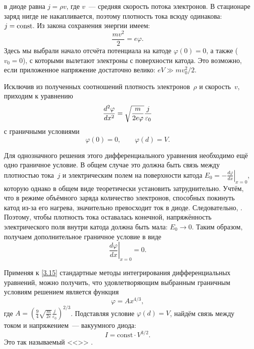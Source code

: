  в диоде равна $j=\rho v$, где $v$~---
средняя скорость потока электронов. В стационаре заряд нигде не накапливается,
поэтому плотность тока всюду одинакова: $j=\mathrm{const}$. Из закона сохранения
энергии имеем:
\begin{equation*}
    \frac{mv^2}{2}=e\varphi.
\end{equation*}
Здесь мы выбрали начало отсчёта потенциала на катоде $\varphi(0)=0$, а также
 ($v_0=0$),
с которыми вылетают электроны с поверхности катода. Это возможно, если
приложенное напряжение достаточно велико: $eV\gg mv_0^2/2$.

Исключив из полученных соотношений плотность электронов~$\rho$ и скорость~$v$,
приходим к уравнению
\begin{equation}
    \eqmark{3.15}
    \frac{d^2\varphi}{dx^2}=\sqrt{\frac{m}{2e\varphi}} \frac{j}{\varepsilon_0}
\end{equation}
с граничными условиями
\begin{equation*}
 \varphi(0)=0,\qquad \varphi(d)=V.
\end{equation*}

Для однозначного решения этого дифференциального уравнения необходимо ещё одно
граничное условие. В общем случае это должна быть связь между плотностью
тока~$j$ и электрическим полем на поверхности катода
$E_0 = -\left.\frac{d\varphi}{dx}\right|_{x=0}$,
которую однако в общем виде теоретически установить затруднительно.
Учтём, что в режиме объёмного заряда количество электронов, способных покинуть
катод из-за его нагрева, значительно превосходит ток в диоде.
Следовательно, . Поэтому, чтобы плотность тока оставалась конечной,
напряжённость электрического поля внутри катода должна быть мала: $E_0\to 0$.
Таким образом, получаем дополнительное граничное условие в виде
\begin{equation*}
    \left.\frac{d\varphi}{dx}\right|_{x = 0}=0.
\end{equation*}

Применяя к \eqref{3.15} стандартные методы интегрирования дифференциальных
уравнений, можно получить, что удовлетворяющим выбранным граничным условиям
решением является функция
\begin{equation*}
    \varphi = A x^{4/3},
\end{equation*}
где $A = \left(\frac{9}{4}\sqrt{\frac{m}{2e}}\frac{j}{\varepsilon_0}\right)^{2/3}$.
Подставляя условие $\varphi(d)=V$, найдём связь между током и напряжением~---
 вакуумного диода:
\begin{equation}
    I = \mathrm{const} \cdot V^{3/2}.
\end{equation}
Это так называемый <<>> .



